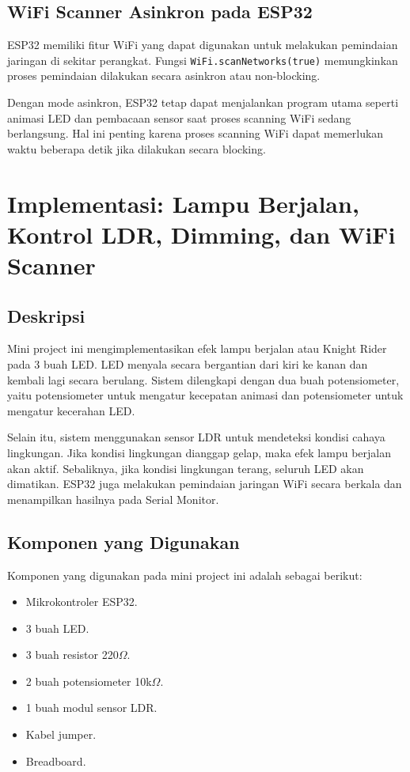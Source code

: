 \documentclass[12pt,a4paper]{article}
\begin{document}
\subsection{WiFi Scanner Asinkron pada ESP32}
ESP32 memiliki fitur WiFi yang dapat digunakan untuk melakukan pemindaian jaringan di sekitar perangkat. Fungsi \texttt{WiFi.scanNetworks(true)} memungkinkan proses pemindaian dilakukan secara asinkron atau non-blocking.

Dengan mode asinkron, ESP32 tetap dapat menjalankan program utama seperti animasi LED dan pembacaan sensor saat proses scanning WiFi sedang berlangsung. Hal ini penting karena proses scanning WiFi dapat memerlukan waktu beberapa detik jika dilakukan secara blocking.

\section{Implementasi: Lampu Berjalan, Kontrol LDR, Dimming, dan WiFi Scanner}

\subsection{Deskripsi}
Mini project ini mengimplementasikan efek lampu berjalan atau Knight Rider pada 3 buah LED. LED menyala secara bergantian dari kiri ke kanan dan kembali lagi secara berulang. Sistem dilengkapi dengan dua buah potensiometer, yaitu potensiometer untuk mengatur kecepatan animasi dan potensiometer untuk mengatur kecerahan LED.

Selain itu, sistem menggunakan sensor LDR untuk mendeteksi kondisi cahaya lingkungan. Jika kondisi lingkungan dianggap gelap, maka efek lampu berjalan akan aktif. Sebaliknya, jika kondisi lingkungan terang, seluruh LED akan dimatikan. ESP32 juga melakukan pemindaian jaringan WiFi secara berkala dan menampilkan hasilnya pada Serial Monitor.

\subsection{Komponen yang Digunakan}
Komponen yang digunakan pada mini project ini adalah sebagai berikut:
\begin{itemize}
    \item Mikrokontroler ESP32.
    \item 3 buah LED.
    \item 3 buah resistor 220$\Omega$.
    \item 2 buah potensiometer 10k$\Omega$.
    \item 1 buah modul sensor LDR.
    \item Kabel jumper.
    \item Breadboard.
\end{itemize}
\end{document}
